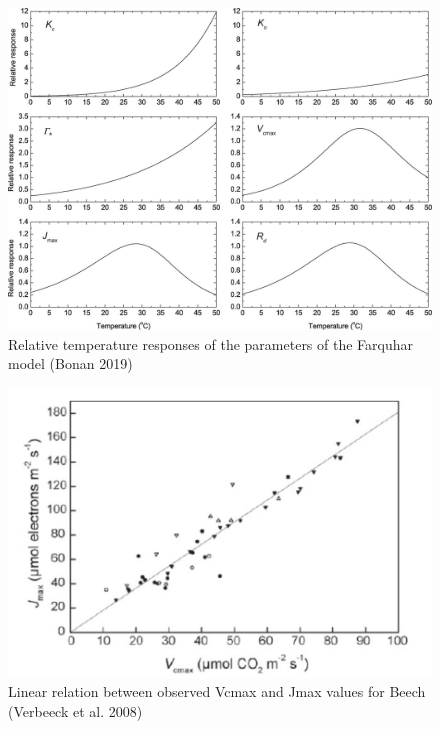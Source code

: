 \documentclass[
  oneside]{book}
\begin{document}
\begin{figure}

{\centering \includegraphics[width=0.8\linewidth]{figures/chap2/temp_responses} 

}

\caption{Relative temperature responses of the parameters of the Farquhar model (Bonan 2019)}\label{fig:f28bis}
\end{figure}

\begin{figure}

{\centering \includegraphics[width=0.8\linewidth]{figures/chap2/vcmax_jmax} 

}

\caption{Linear relation between observed Vcmax and Jmax values for Beech (Verbeeck et al. 2008)}\label{fig:f29}
\end{figure}
\end{document}

